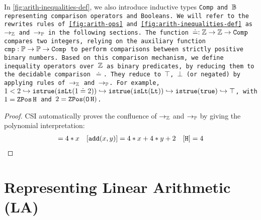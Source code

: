 In \cref{fig:arith-inequalities-def}, we also introduce inductive types \tt{Comp}  and $\B$ representing comparison operators and Booleans.
We will refer to the rewrites rules of \cref{fig:arith-ops} and \cref{fig:arith-inequalities-def} as $\ra_\Z$ and $\ra_\bb{P}$ in the following sections.
The function $\doteq : \Z \to \Z \to \texttt{Comp}$ compares two integers, relying on the auxiliary function $\texttt{cmp} : \bb{P} \to \bb{P} \to \texttt{Comp}$ to perform comparisons between strictly positive binary numbers.
Based on this comparison mechanism, we define inequality operators over $\Z$ as binary predicates, by reducing them to the decidable comparison $\doteq$. They reduce to $\top$, $\bot$ (or negated) by applying rules of $\ra_\Z$ and $\ra_\bb{P}$.
For example, $1 < 2 \hookrightarrow \tt{istrue}(\tt{isLt}(1 \doteq 2)) \hookrightarrow \tt{istrue}(\tt{isLt}(\tt{Lt})) \hookrightarrow \tt{istrue}(\tt{true}) \hookrightarrow \top$, with $1 = \mathop{\ZPos} \tt{H}$ and $2 = \mathop{\ZPos} (\mathop{\tt{O}} \tt{H})$.

\begin{lemma}
\begin{proof}
CSI \cite{CSI} automatically proves the confluence of $\ra_\bb{Z}$ and $\ra_\bb{P}$ by giving the polynomial interpretation:
\begin{align*}
[\tt{succ}(x)] = 4*x & &[\tt{add}(x, y)] = 4 * x + 4 * y + 2  & &[ {\tt{H}} ] = 4 \\
\end{align*}
\end{proof}
\label{lemma:confluenceZP}
\end{lemma}


\section{Representing Linear Arithmetic (\textbf{LA})}
\label{ssec:encoding-la}



